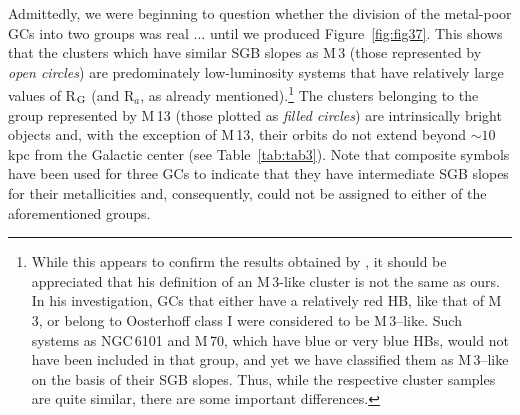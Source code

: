 \documentclass[12pt,preprint]{aastex}
\newcommand\lta{\mathrel{\hbox{\raise 0.6 ex \hbox{$<$}\kern
                   -1.8 ex\lower .5 ex\hbox{$\sim$}}}}
\newcommand\gta{\mathrel{\hbox{\raise 0.6 ex \hbox{$>$}\kern
                   -1.7 ex\lower .5 ex\hbox{$\sim$}}}}
\begin{document}
Admittedly, we were beginning to question whether the division of the metal-poor
GCs into two groups was real $\ldots$ until we produced Figure~\ref{fig:fig37}.
This shows that the clusters which have similar SGB slopes as M$\,$3 (those
represented by {\it open circles}) are predominately low-luminosity
systems that have relatively large values of R$_{\rm G}$ (and R$_a$, as already
mentioned).\footnote{While this appears to confirm the results obtained by
\citet{vsid93}, it should be appreciated that his definition of an M$\,$3-like
cluster is not the same as ours.  In his investigation, GCs that either have a
relatively red HB, like that of M$\,$3, or belong to Oosterhoff class I were
considered to be M$\,$3--like.  Such systems as NGC$\,$6101 and M$\,$70, which
have blue or very blue HBs, would not have been included in that group, and yet
we have classified them as M$\,$3--like on the basis of their SGB slopes.  Thus,
while the respective cluster samples are quite similar, there are some
important differences.}  The clusters belonging to the group represented by
M$\,$13 (those plotted as {\it filled circles}) are intrinsically bright
objects and, with the exception of M$\,$13, their orbits do not extend beyond
$\sim 10$ kpc from the Galactic center (see Table~\ref{tab:tab3}).  Note that
composite symbols have been used for three GCs to indicate that they have 
intermediate SGB slopes for their metallicities and, consequently, could not
be assigned to either of the aforementioned groups. 
\end{document}
